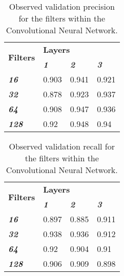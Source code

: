 \documentclass{article}
\begin{document}
\begin{table}[] \footnotesize
\centering
\caption{Observed validation precision for the filters within the Convolutional Neural Network.}
\label{tab:cnn-precision}
\begin{tabular}{@{}llll@{}}
\toprule
\multirow{2}{*}{\textbf{Filters}} & \multicolumn{3}{l}{\textbf{Layers}}                             \\ \cmidrule(l){2-4} 
                                  & \textit{\textbf{1}} & \textit{\textbf{2}} & \textit{\textbf{3}} \\ \cmidrule(r){1-1}
\textit{\textbf{16}}              & 0.903               & 0.941               & 0.921               \\
\textit{\textbf{32}}              & 0.878               & 0.923               & 0.937               \\
\textit{\textbf{64}}              & 0.908               & 0.947               & 0.936               \\
\textit{\textbf{128}}             & 0.92                & 0.948               & 0.94       \\ \bottomrule
\end{tabular}
\end{table}

\begin{table}[] \footnotesize
\centering
\caption{Observed validation recall for the filters within the Convolutional Neural Network.}
\label{tab:cnn-recall}
\begin{tabular}{@{}llll@{}}
\toprule
\multirow{2}{*}{\textbf{Filters}} & \multicolumn{3}{l}{\textbf{Layers}}                             \\ \cmidrule(l){2-4} 
                                  & \textit{\textbf{1}} & \textit{\textbf{2}} & \textit{\textbf{3}} \\ \cmidrule(r){1-1}
\textit{\textbf{16}}              & 0.897               & 0.885               & 0.911               \\
\textit{\textbf{32}}              & 0.938               & 0.936               & 0.912               \\
\textit{\textbf{64}}              & 0.92                & 0.904               & 0.91                \\
\textit{\textbf{128}}             & 0.906               & 0.909               & 0.898               \\ \bottomrule
\end{tabular}
\end{table}
\end{document}
